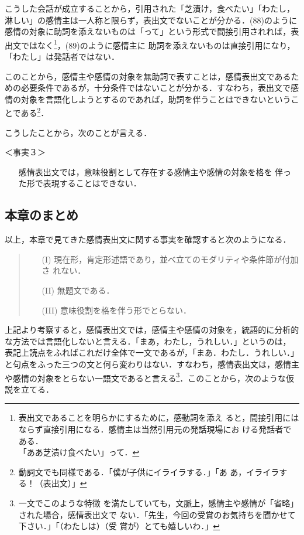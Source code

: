 こうした会話が成立することから，引用された「芝漬け，食べたい」「わたし，
淋しい」の感情主は一人称と限らず，表出文でないことが分かる．(88)のように
感情の対象に助詞を添えないものは「って」という形式で間接引用されれば，表
出文ではなく\footnote{表出文であることを明らかにするために，感動詞を添え
ると，間接引用にはならず直接引用になる．感情主は当然引用元の発話現場にお
ける発話者である．\\「ああ芝漬け食べたい」って．}，(89)のように感情主に
助詞を添えないものは直接引用になり，「わたし」は発話者ではない．

このことから，感情主や感情の対象を無助詞で表すことは，感情表出文であるた
めの必要条件であるが，十分条件ではないことが分かる．すなわち，表出文で感
情の対象を言語化しようとするのであれば，助詞を伴うことはできないというこ
とである\footnote{動詞文でも同様である．「僕が子供にイライラする．」「あ
あ，イライラする！（表出文）」}．

こうしたことから，次のことが言える．

＜事実３＞
\begin{itemize}
 \item[] 感情表出文では，意味役割として存在する感情主や感情の対象を格を
	 伴った形で表現することはできない．
\end{itemize}

\subsection{本章のまとめ}

以上，本章で見てきた感情表出文に関する事実を確認すると次のようになる．

\begin{quote}
\begin{itemize}
 \item[(I)] 現在形，肯定形述語であり，並べ立てのモダリティや条件節が付加さ
	  れない．
 \item[(II)] 無題文である．
 \item[(III)] 意味役割を格を伴う形でとらない．
\end{itemize}
\end{quote}

上記より考察すると，感情表出文では，感情主や感情の対象を，統語的に分析的
な方法では言語化しないと言える．「まあ，わたし，うれしい．」というのは，
表記上読点をふればこれだけ全体で一文であるが，「まあ．わたし．うれしい．」
と句点をふった三つの文と何ら変わりはない．すなわち，感情表出文は，感情主
や感情の対象をとらない一語文であると言える\footnote{一文でこのような特徴
を満たしていても，文脈上，感情主や感情が「省略」された場合，感情表出文で
ない．「先生，今回の受賞のお気持ちを聞かせて下さい．」「（わたしは）（受
賞が）とても嬉しいわ．」}．このことから，次のような仮説を立てる．

